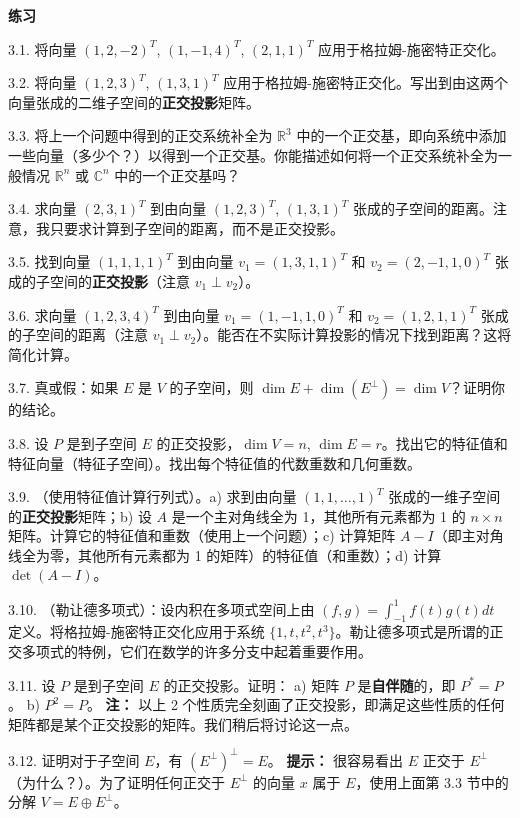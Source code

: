 \textbf{练习}~

3.1. 将向量 $(1, 2, -2)^T$, $(1, -1, 4)^T$, $(2, 1, 1)^T$ 应用于格拉姆-施密特正交化。

3.2. 将向量 $(1, 2, 3)^T$, $(1, 3, 1)^T$ 应用于格拉姆-施密特正交化。写出到由这两个向量张成的二维子空间的\textbf{正交投影}矩阵。



3.3. 将上一个问题中得到的正交系统补全为 $\mathbb{R}^3$ 中的一个正交基，即向系统中添加一些向量（多少个？）以得到一个正交基。你能描述如何将一个正交系统补全为一般情况 $\mathbb{R}^n$ 或 $\mathbb{C}^n$ 中的一个正交基吗？

3.4. 求向量 $(2, 3, 1)^T$ 到由向量 $(1, 2, 3)^T$, $(1, 3, 1)^T$ 张成的子空间的距离。注意，我只要求计算到子空间的距离，而不是正交投影。

3.5. 找到向量 $(1, 1, 1, 1)^T$ 到由向量 $v_1 = (1, 3, 1, 1)^T$ 和 $v_2 = (2, -1, 1, 0)^T$ 张成的子空间的\textbf{正交投影}（注意 $v_1 \perp v_2$）。

3.6. 求向量 $(1, 2, 3, 4)^T$ 到由向量 $v_1 = (1, -1, 1, 0)^T$ 和 $v_2 = (1, 2, 1, 1)^T$ 张成的子空间的距离（注意 $v_1 \perp v_2$）。能否在不实际计算投影的情况下找到距离？这将简化计算。

3.7. 真或假：如果 $E$ 是 $V$ 的子空间，则 $\dim E + \dim(E^\perp) = \dim V$？证明你的结论。

3.8. 设 $P$ 是到子空间 $E$ 的正交投影，$\dim V = n$, $\dim E = r$。找出它的特征值和特征向量（特征子空间）。找出每个特征值的代数重数和几何重数。

3.9. （使用特征值计算行列式）。a) 求到由向量 $(1, 1, \dots, 1)^T$ 张成的一维子空间的\textbf{正交投影}矩阵；b) 设 $A$ 是一个主对角线全为 1，其他所有元素都为 1 的 $n \times n$ 矩阵。计算它的特征值和重数（使用上一个问题）；c) 计算矩阵 $A-I$（即主对角线全为零，其他所有元素都为 1 的矩阵）的特征值（和重数）；d) 计算 $\det(A-I)$。

3.10. （勒让德多项式）：设内积在多项式空间上由 $(f, g) = \int_{-1}^1 f(t)g(t)dt$ 定义。将格拉姆-施密特正交化应用于系统 $\{1, t, t^2, t^3\}$。勒让德多项式是所谓的正交多项式的特例，它们在数学的许多分支中起着重要作用。

3.11. 设 $P$ 是到子空间 $E$ 的正交投影。证明：
a) 矩阵 $P$ 是\textbf{自伴随}的，即 $P^* = P$。
b) $P^2 = P$。
\textbf{注：} 以上 2 个性质完全刻画了正交投影，即满足这些性质的任何矩阵都是某个正交投影的矩阵。我们稍后将讨论这一点。



3.12. 证明对于子空间 $E$，有 $(E^\perp)^\perp = E$。
\textbf{提示：} 很容易看出 $E$ 正交于 $E^\perp$（为什么？）。为了证明任何正交于 $E^\perp$ 的向量 $x$ 属于 $E$，使用上面第 3.3 节中的分解 $V = E \oplus E^\perp$。

